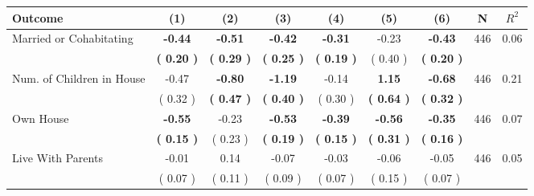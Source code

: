 \begin{tabular}{lcccccccc}
\toprule
 \textbf{Outcome} & \textbf{(1)} & \textbf{(2)} & \textbf{(3)} & \textbf{(4)} & \textbf{(5)} & \textbf{(6)} & \textbf{N} & \textbf{$ R^2$} \\
\midrule
Married or Cohabitating & \textbf{    -0.44} & \textbf{    -0.51} & \textbf{    -0.42} & \textbf{    -0.31} &     -0.23 & \textbf{    -0.43} & 446 &       0.06 \\ 
 & \textbf{(     0.20 )} & \textbf{(     0.29 )} & \textbf{(     0.25 )} & \textbf{(     0.19 )} & (     0.40 ) & \textbf{(     0.20 )} & \\
Num. of Children in House &     -0.47 & \textbf{    -0.80} & \textbf{    -1.19} &     -0.14 & \textbf{     1.15} & \textbf{    -0.68} & 446 &       0.21 \\ 
 & (     0.32 ) & \textbf{(     0.47 )} & \textbf{(     0.40 )} & (     0.30 ) & \textbf{(     0.64 )} & \textbf{(     0.32 )} & \\
Own House & \textbf{    -0.55} &     -0.23 & \textbf{    -0.53} & \textbf{    -0.39} & \textbf{    -0.56} & \textbf{    -0.35} & 446 &       0.07 \\ 
 & \textbf{(     0.15 )} & (     0.23 ) & \textbf{(     0.19 )} & \textbf{(     0.15 )} & \textbf{(     0.31 )} & \textbf{(     0.16 )} & \\
Live With Parents &     -0.01 &      0.14 &     -0.07 &     -0.03 &     -0.06 &     -0.05 & 446 &       0.05 \\ 
 & (     0.07 ) & (     0.11 ) & (     0.09 ) & (     0.07 ) & (     0.15 ) & (     0.07 ) & \\
\bottomrule
\end{tabular}
